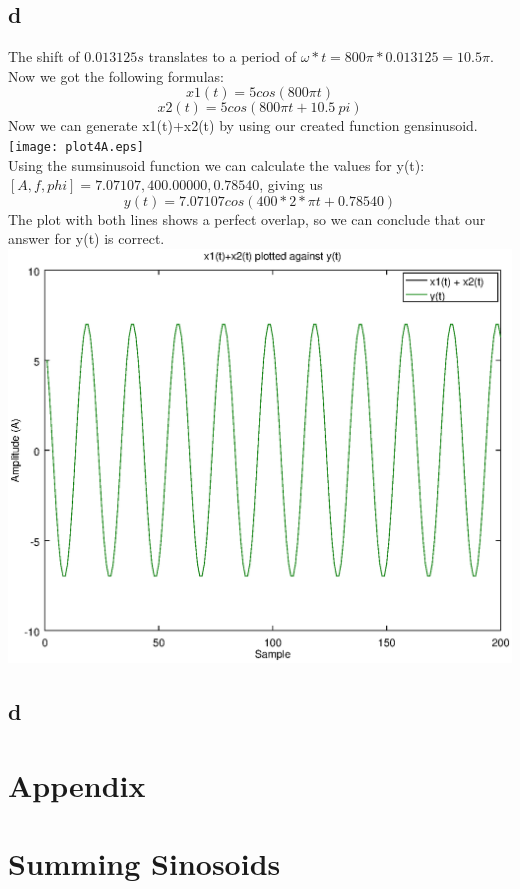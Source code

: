 \documentclass[10pt]{article}
\begin{document}
\subsection{d}
The shift of $0.013125s$ translates to a period of $\omega * t = 800\pi*0.013125 = 10.5\pi$.
Now we got the following formulas:
\begin{equation}
    x1(t) = 5 cos(800\pi t)
\end{equation}
\begin{equation}
    x2(t) = 5 cos(800\pi t + 10.5\:pi)
\end{equation}
Now we can generate x1(t)+x2(t) by using our created function gensinusoid.\\
\texttt{[image: plot4A.eps]}\\
Using the sumsinusoid function we can calculate the values for y(t):
$[A, f, phi] = 7.07107,400.00000,0.78540$, giving us\
\begin{equation}
    y(t) = 7.07107 cos(400*2*\pi t + 0.78540)
\end{equation}
The plot with both lines shows a perfect overlap,
so we can conclude that our answer for y(t) is correct.
\includegraphics[width=\columnwidth]{plot4B.eps}

\subsection{d}


\newpage
\section*{Appendix}
\appendix
\section{Summing Sinosoids}
\end{document}
